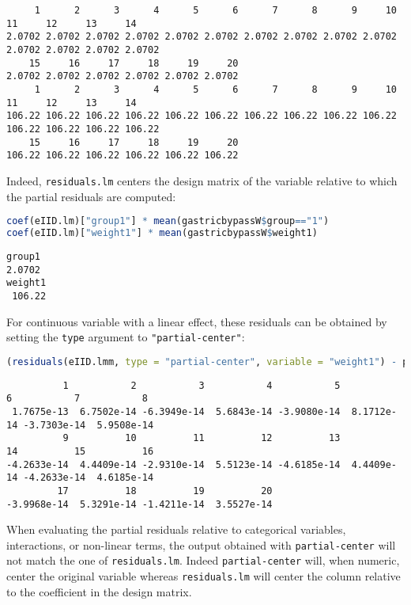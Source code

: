 \documentclass[12pt]{article}
\newcommand\Warning[1][3ex]{%
\renewcommand\stacktype{L}%
\scaleto{\stackon[1.3pt]{\color{red}$\triangle$}{\tiny\bfseries !}}{#1}%
\xspace
}
\begin{document}
\label{}
\begin{verbatim}
     1      2      3      4      5      6      7      8      9     10     11     12     13     14 
2.0702 2.0702 2.0702 2.0702 2.0702 2.0702 2.0702 2.0702 2.0702 2.0702 2.0702 2.0702 2.0702 2.0702 
    15     16     17     18     19     20 
2.0702 2.0702 2.0702 2.0702 2.0702 2.0702
     1      2      3      4      5      6      7      8      9     10     11     12     13     14 
106.22 106.22 106.22 106.22 106.22 106.22 106.22 106.22 106.22 106.22 106.22 106.22 106.22 106.22 
    15     16     17     18     19     20 
106.22 106.22 106.22 106.22 106.22 106.22
\end{verbatim}


Indeed, \texttt{residuals.lm} centers the design matrix of the variable
relative to which the partial residuals are computed:
\begin{lstlisting}[language=r,numbers=none]
coef(eIID.lm)["group1"] * mean(gastricbypassW$group=="1")
coef(eIID.lm)["weight1"] * mean(gastricbypassW$weight1)
\end{lstlisting}

\label{}
\begin{verbatim}
group1 
2.0702
weight1 
 106.22
\end{verbatim}


For continuous variable with a linear effect, these residuals can be
obtained by setting the \texttt{type} argument to \texttt{"partial-center"}:
\begin{lstlisting}[language=r,numbers=none]
(residuals(eIID.lmm, type = "partial-center", variable = "weight1") - pRes.lm[,"weight1"])
\end{lstlisting}

\label{}
\begin{verbatim}
          1           2           3           4           5           6           7           8 
 1.7675e-13  6.7502e-14 -6.3949e-14  5.6843e-14 -3.9080e-14  8.1712e-14 -3.7303e-14  5.9508e-14 
          9          10          11          12          13          14          15          16 
-4.2633e-14  4.4409e-14 -2.9310e-14  5.5123e-14 -4.6185e-14  4.4409e-14 -4.2633e-14  4.6185e-14 
         17          18          19          20 
-3.9968e-14  5.3291e-14 -1.4211e-14  3.5527e-14
\end{verbatim}


\Warning When evaluating the partial residuals relative to categorical
variables, interactions, or non-linear terms, the output obtained with
\texttt{partial-center} will not match the one of \texttt{residuals.lm}. Indeed
\texttt{partial-center} will, when numeric, center the original variable
whereas \texttt{residuals.lm} will center the column relative to the
coefficient in the design matrix.
\end{document}
